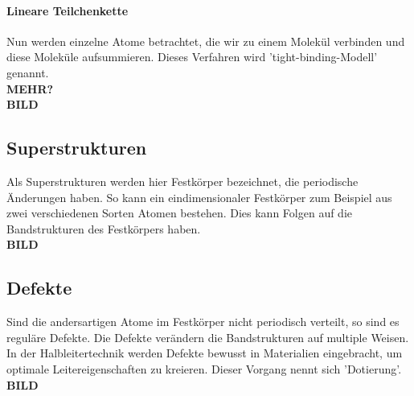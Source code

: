 \paragraph{Lineare Teilchenkette}
Nun werden einzelne Atome betrachtet, die wir zu einem Molekül verbinden und diese Moleküle aufsummieren.
Dieses Verfahren wird 'tight-binding-Modell' genannt.
\\\textbf{\huge{MEHR?}}
\\\textbf{\huge{BILD}}
%
\subsection{Superstrukturen}
Als Superstrukturen werden hier Festkörper bezeichnet, die periodische Änderungen haben.
So kann ein eindimensionaler Festkörper zum Beispiel aus zwei verschiedenen Sorten Atomen bestehen.
Dies kann Folgen auf die Bandstrukturen des Festkörpers haben.
\\\textbf{\huge{BILD}}
%
\subsection{Defekte}
Sind die andersartigen Atome im Festkörper nicht periodisch verteilt, so sind es reguläre Defekte.
Die Defekte verändern die Bandstrukturen auf multiple Weisen.
In der Halbleitertechnik werden Defekte bewusst in Materialien eingebracht, um optimale Leitereigenschaften zu kreieren.
Dieser Vorgang nennt sich 'Dotierung'.
\\\textbf{\huge{BILD}}
%
